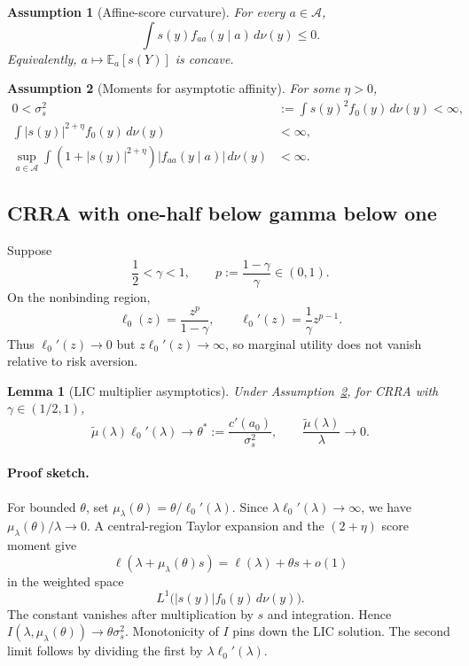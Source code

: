 \documentclass[11pt]{article}
\newtheorem{assumption}{Assumption}
\newtheorem{lemma}{Lemma}
\theoremstyle{remark}
\newcommand{\E}{\mathbb E}
\newcommand{\dd}{\,d\nu}
\newcommand{\cA}{\mathcal A}
\newcommand{\proofsketch}{\paragraph{Proof sketch.}}
\begin{document}
\begin{assumption}[Affine-score curvature]
\label{ass:affine-score}
For every $a\in\cA$,
\begin{equation}
 \int s(y)f_{aa}(y\mid a)\dd(y)\le0.
 \tag{Affine}\label{eq:affine-score}
\end{equation}
Equivalently, $a\mapsto\E_a[s(Y)]$ is concave.
\end{assumption}

\begin{assumption}[Moments for asymptotic affinity]
\label{ass:affinity-moments}
For some $\eta>0$,
\begin{align*}
 0<\sigma_s^2&:=\int s(y)^2f_0(y)\dd(y)<\infty,\\
 \int |s(y)|^{2+\eta}f_0(y)\dd(y)&<\infty,\\
 \sup_{a\in\cA}\int
 (1+|s(y)|^{2+\eta})|f_{aa}(y\mid a)|\dd(y)&<\infty.
\end{align*}
\end{assumption}

\subsection{CRRA with one-half below gamma below one}

Suppose
\[
 \frac12<\gamma<1,
 \qquad
 p:=\frac{1-\gamma}{\gamma}\in(0,1).
\]
On the nonbinding region,
\[
 \ell_0(z)=\frac{z^p}{1-\gamma},
 \qquad
 \ell_0'(z)=\frac1\gamma z^{p-1}.
\]
Thus $\ell_0'(z)\to0$ but $z\ell_0'(z)\to\infty$, so marginal utility does not
vanish relative to risk aversion.

\begin{lemma}[LIC multiplier asymptotics]
\label{lem:affinity-multiplier}
Under Assumption~\ref{ass:affinity-moments}, for CRRA with
$\gamma\in(1/2,1)$,
\[
 \widetilde\mu(\lambda)\ell_0'(\lambda)
 \longrightarrow
 \theta^*:=\frac{c'(a_0)}{\sigma_s^2},
 \qquad
 \frac{\widetilde\mu(\lambda)}{\lambda}\longrightarrow0.
\]
\end{lemma}

\proofsketch
For bounded $\theta$, set $\mu_\lambda(\theta)=\theta/\ell_0'(\lambda)$.  Since
$\lambda\ell_0'(\lambda)\to\infty$, we have $\mu_\lambda(\theta)/\lambda\to0$.
A central-region Taylor expansion and the $(2+\eta)$ score moment give
\[
 \ell(\lambda+\mu_\lambda(\theta)s)
 =\ell(\lambda)+\theta s+o(1)
\]
in the weighted space
\[
 L^1\bigl(|s(y)|f_0(y)\dd(y)\bigr).
\]
The constant vanishes after multiplication by $s$ and integration.  Hence
$I(\lambda,\mu_\lambda(\theta))\to\theta\sigma_s^2$.
Monotonicity of $I$ pins down the LIC solution.  The second limit follows by
dividing the first by $\lambda\ell_0'(\lambda)$.
\end{document}
